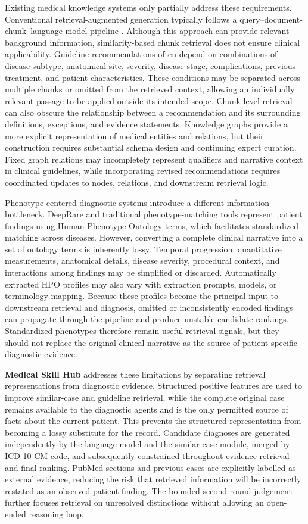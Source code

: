 \documentclass[10pt,letterpaper]{article}
\newcommand{\systemname}{\textbf{Medical Skill Hub}}
\begin{document}
Existing medical knowledge systems only partially address these requirements.
Conventional retrieval-augmented generation typically follows a
query--document-chunk--language-model pipeline \cite{lewis2020retrieval}. Although
this approach can provide relevant background information, similarity-based
chunk retrieval does not ensure clinical applicability. Guideline
recommendations often depend on combinations of disease subtype, anatomical
site, severity, disease stage, complications, previous treatment, and patient
characteristics. These conditions may be separated across multiple chunks or
omitted from the retrieved context, allowing an individually relevant passage
to be applied outside its intended scope. Chunk-level retrieval can also obscure
the relationship between a recommendation and its surrounding definitions,
exceptions, and evidence statements. Knowledge graphs provide a more explicit
representation of medical entities and relations, but their construction
requires substantial schema design and continuing expert curation. Fixed graph
relations may incompletely represent qualifiers and narrative context in
clinical guidelines, while incorporating revised recommendations requires
coordinated updates to nodes, relations, and downstream retrieval logic.

Phenotype-centered diagnostic systems introduce a different information
bottleneck. DeepRare and traditional phenotype-matching tools represent patient
findings using Human Phenotype Ontology terms, which facilitates standardized
matching across diseases. However, converting a complete clinical narrative
into a set of ontology terms is inherently lossy. Temporal progression,
quantitative measurements, anatomical details, disease severity, procedural
context, and interactions among findings may be simplified or discarded.
Automatically extracted HPO profiles may also vary with extraction prompts,
models, or terminology mapping. Because these profiles become the principal
input to downstream retrieval and diagnosis, omitted or inconsistently encoded
findings can propagate through the pipeline and produce unstable candidate
rankings. Standardized phenotypes therefore remain useful retrieval signals,
but they should not replace the original clinical narrative as the source of
patient-specific diagnostic evidence.

\systemname{} addresses these limitations by separating retrieval representations
from diagnostic evidence. Structured positive features are used to improve
similar-case and guideline retrieval, while the complete original case remains
available to the diagnostic agents and is the only permitted source of facts
about the current patient. This prevents the structured representation from
becoming a lossy substitute for the record. Candidate diagnoses are generated
independently by the language model and the similar-case module, merged by
ICD-10-CM code, and subsequently constrained throughout evidence retrieval and
final ranking. PubMed sections and previous cases are explicitly labelled as
external evidence, reducing the risk that retrieved information will be
incorrectly restated as an observed patient finding. The bounded second-round
judgement further focuses retrieval on unresolved distinctions without allowing
an open-ended reasoning loop.
\end{document}
